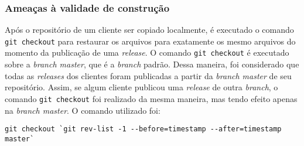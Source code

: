 \subsubsection{Ameaças à validade de construção}
Após o repositório de um cliente ser copiado localmente, é executado o comando \texttt{git checkout} para restaurar os arquivos para exatamente os mesmo arquivos do momento da publicação de uma \textit{release}. O comando \texttt{git checkout} é executado sobre a \textit{branch master}, que é a \textit{branch} padrão. Dessa maneira, foi considerado que todas as \textit{releases} dos clientes foram publicadas a partir da \textit{branch master} de seu repositório. Assim, se algum cliente publicou uma \textit{release} de outra \textit{branch}, o comando \texttt{git checkout} foi realizado da mesma maneira, mas tendo efeito apenas na \textit{branch master}. O comando utilizado foi:

\begin{lstlisting}[style=bash, label=cod:undefined_object]
git checkout `git rev-list -1 --before=timestamp --after=timestamp master`
\end{lstlisting}

